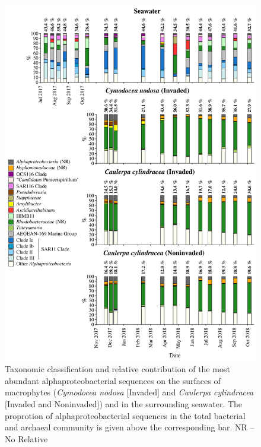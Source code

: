 \documentclass[12pt,]{article}
\begin{document}
\begin{figure}[H]

{\centering \includegraphics[width=0.85\linewidth]{../results/figures/alphaproteobacteria_bar_plot} 

}

\caption{Taxonomic classification and relative contribution of the most abundant alphaproteobacterial sequences on the surfaces of macrophytes (\textit{Cymodocea nodosa} [Invaded] and \textit{Caulerpa cylindracea} [Invaded and Noninvaded]) and in the surrounding seawater. The proprotion of alphaproteobacterial sequences in the total bacterial and archaeal community is given above the corresponding bar. NR -- No Relative\label{alpha}}\label{fig:unnamed-chunk-9}
\end{figure}
\end{document}
